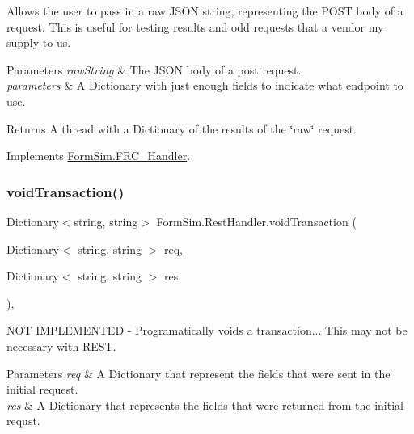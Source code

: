Allows the user to pass in a raw J\+S\+ON string, representing the P\+O\+ST body of a request. This is useful for testing results and odd requests that a vendor my supply to us. 


\begin{DoxyParams}{Parameters}
{\em raw\+String} & The J\+S\+ON body of a post request.\\
\hline
{\em parameters} & A Dictionary with just enough fields to indicate what endpoint to use.\\
\hline
\end{DoxyParams}
\begin{DoxyReturn}{Returns}
A thread with a Dictionary of the results of the \char`\"{}raw\char`\"{} request.
\end{DoxyReturn}


Implements \mbox{\hyperlink{interface_form_sim_1_1_f_r_c___handler_ad4b9146b6142d1d6ded15e5de4ed4675}{Form\+Sim.\+F\+R\+C\+\_\+\+Handler}}.

\mbox{\label{class_form_sim_1_1_rest_handler_a7c2e17caa0c591a104e9e4f9a3825f47}} 
\subsubsection{\texorpdfstring{void\+Transaction()}{voidTransaction()}}
{\footnotesize\ttfamily Dictionary$<$string, string$>$ Form\+Sim.\+Rest\+Handler.\+void\+Transaction (\begin{DoxyParamCaption}\item[{Dictionary$<$ string, string $>$}]{req,  }\item[{Dictionary$<$ string, string $>$}]{res }\end{DoxyParamCaption})\hspace{0.3cm}{\ttfamily [inline]}, {\ttfamily [private]}}



N\+OT I\+M\+P\+L\+E\+M\+E\+N\+T\+ED -\/ Programatically voids a transaction... This may not be necessary with R\+E\+ST. 


\begin{DoxyParams}{Parameters}
{\em req} & A Dictionary that represent the fields that were sent in the initial request.\\
\hline
{\em res} & A Dictionary that represents the fields that were returned from the initial requst.\\
\hline
\end{DoxyParams}


